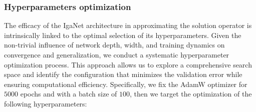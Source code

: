 \documentclass{article}
\theoremstyle{plain}
\numberwithin{equation}{section}
\begin{document}
\subsubsection{Hyperparameters optimization}\label{sec:hyperparameters_optimization}
The efficacy of the IgaNet architecture in approximating the solution operator is intrinsically linked to the optimal selection of its hyperparameters. Given the non-trivial influence of network depth, width, and training dynamics on convergence and generalization, we conduct a systematic hyperparameter optimization process. This approach allows us to explore a comprehensive search space and identify the configuration that minimizes the validation error while ensuring computational efficiency. Specifically, we fix the AdamW optimizer for $5000$ epochs and with a batch size of $100$, then we target the optimization of the following hyperparameters:
\end{document}
